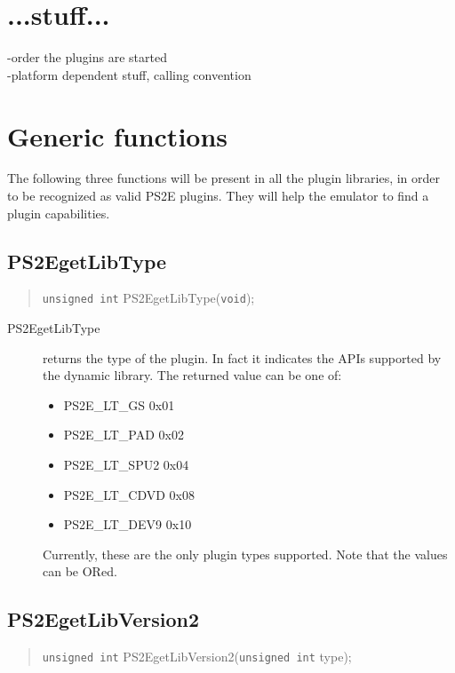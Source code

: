\documentclass[10pt]{article}
\begin{document}
\section{...stuff...}
-order the plugins are started\\
-platform dependent stuff, calling convention\\

\section{Generic functions}
The following three functions will be present in all the plugin libraries,
 in order to be recognized as valid PS2E plugins. They will help
 the emulator to find a plugin capabilities.

\subsection{PS2EgetLibType}
\begin{quote}\texttt{unsigned int} PS2EgetLibType(\texttt{void});\end{quote}

\begin{description}
\item[PS2EgetLibType] returns the type of the plugin.
 In fact it indicates the APIs supported by the dynamic library.
 The returned value can be one of:
\begin{itemize}
\item PS2E\_LT\_GS   0x01
\item PS2E\_LT\_PAD  0x02
\item PS2E\_LT\_SPU2 0x04
\item PS2E\_LT\_CDVD 0x08
\item PS2E\_LT\_DEV9 0x10
\end{itemize}
Currently, these are the only plugin types supported. Note that the values
 can be ORed.
\end{description}



\subsection{PS2EgetLibVersion2}
\begin{quote}\texttt{unsigned int} PS2EgetLibVersion2(\texttt{unsigned int}
 type);\end{quote}
\end{document}
